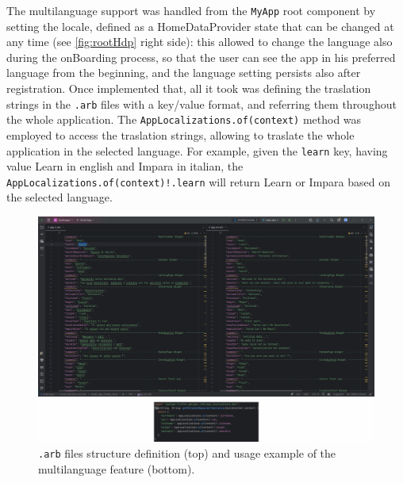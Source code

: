 \newline The multilanguage support was handled from the \texttt{MyApp} root component by setting the locale, defined as a HomeDataProvider state that can be changed at any time (see \cref{fig:rootHdp} right side): this allowed to change the language also during the onBoarding process, so that the user can see the app in his preferred language from the beginning, and the language setting persists also after registration.
\newline Once implemented that, all it took was defining the traslation strings in the \texttt{.arb} files with a key/value format, and referring them throughout the whole application. The \texttt{AppLocalizations.of(context)} method was employed to access the traslation strings, allowing to traslate the whole application in the selected language. \newline For example, given the \texttt{learn} key, having value Learn in english and Impara in italian, the \newline\texttt{AppLocalizations.of(context)!.learn} will return Learn or Impara based on the selected language.

\begin{figure}
    \includegraphics[width=1.0\linewidth]{./images/multiLanguage.jpg}
    \caption{\texttt{.arb} files structure definition (top) and usage example of the multilanguage feature (bottom).}
\end{figure}

